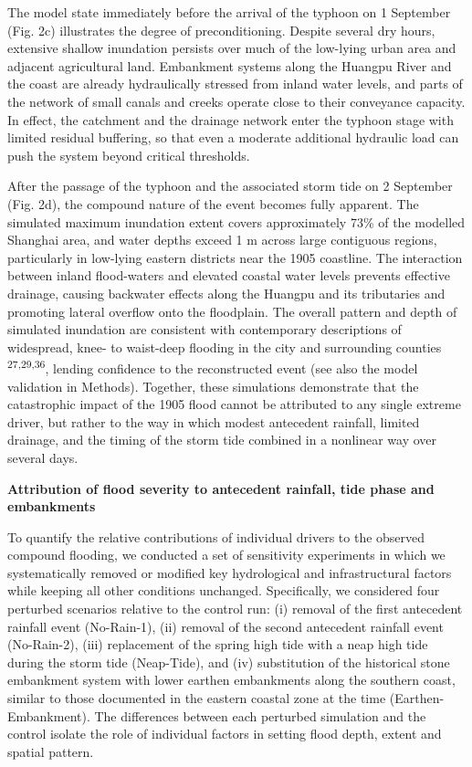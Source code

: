 \documentclass[
]{article}
\begin{document}
The model state immediately before the arrival of the typhoon on 1
September (Fig. 2c) illustrates the degree of preconditioning. Despite
several dry hours, extensive shallow inundation persists over much of
the low-lying urban area and adjacent agricultural land. Embankment
systems along the Huangpu River and the coast are already hydraulically
stressed from inland water levels, and parts of the network of small
canals and creeks operate close to their conveyance capacity. In effect,
the catchment and the drainage network enter the typhoon stage with
limited residual buffering, so that even a moderate additional hydraulic
load can push the system beyond critical thresholds.

After the passage of the typhoon and the associated storm tide on 2
September (Fig. 2d), the compound nature of the event becomes fully
apparent. The simulated maximum inundation extent covers approximately
73\% of the modelled Shanghai area, and water depths exceed 1 m across
large contiguous regions, particularly in low-lying eastern districts
near the 1905 coastline. The interaction between inland flood-waters and
elevated coastal water levels prevents effective drainage, causing
backwater effects along the Huangpu and its tributaries and promoting
lateral overflow onto the floodplain. The overall pattern and depth of
simulated inundation are consistent with contemporary descriptions of
widespread, knee- to waist-deep flooding in the city and surrounding
counties \textsuperscript{27,29,36}, lending confidence to the
reconstructed event (see also the model validation in Methods).
Together, these simulations demonstrate that the catastrophic impact of
the 1905 flood cannot be attributed to any single extreme driver, but
rather to the way in which modest antecedent rainfall, limited drainage,
and the timing of the storm tide combined in a nonlinear way over
several days.

\textbf{Attribution of flood severity to antecedent rainfall, tide phase
and embankments}

To quantify the relative contributions of individual drivers to the
observed compound flooding, we conducted a set of sensitivity
experiments in which we systematically removed or modified key
hydrological and infrastructural factors while keeping all other
conditions unchanged. Specifically, we considered four perturbed
scenarios relative to the control run: (i) removal of the first
antecedent rainfall event (No-Rain-1), (ii) removal of the second
antecedent rainfall event (No-Rain-2), (iii) replacement of the spring
high tide with a neap high tide during the storm tide (Neap-Tide), and
(iv) substitution of the historical stone embankment system with lower
earthen embankments along the southern coast, similar to those
documented in the eastern coastal zone at the time (Earthen-Embankment).
The differences between each perturbed simulation and the control
isolate the role of individual factors in setting flood depth, extent
and spatial pattern.
\end{document}

